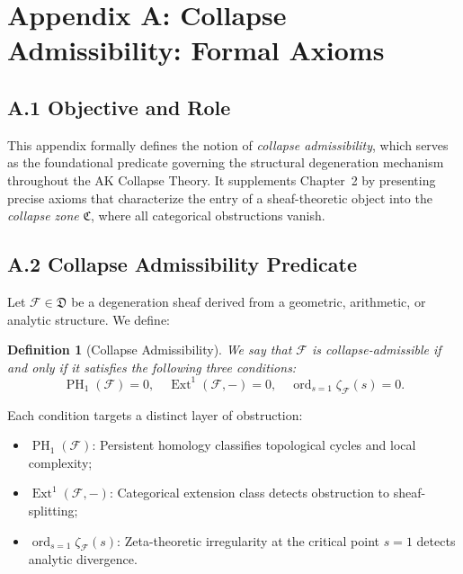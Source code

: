 \documentclass[11pt]{article}
\newtheorem{definition}[theorem]{Definition}
\DeclareMathOperator{\Ext}{Ext}
\DeclareMathOperator{\PH}{PH}
\newcommand{\ord}{\operatorname{ord}}
\begin{document}
\appendix
\section*{Appendix A: Collapse Admissibility: Formal Axioms}

\subsection*{A.1 Objective and Role}

This appendix formally defines the notion of \emph{collapse admissibility}, which serves as the foundational predicate governing the structural degeneration mechanism throughout the AK Collapse Theory. It supplements Chapter~2 by presenting precise axioms that characterize the entry of a sheaf-theoretic object into the \emph{collapse zone} \( \mathfrak{C} \), where all categorical obstructions vanish.

\subsection*{A.2 Collapse Admissibility Predicate}

Let \( \mathcal{F} \in \mathfrak{D} \) be a degeneration sheaf derived from a geometric, arithmetic, or analytic structure. We define:

\begin{definition}[Collapse Admissibility]
\label{def:collapse-admissibility}
We say that \( \mathcal{F} \) is \emph{collapse-admissible} if and only if it satisfies the following three conditions:
\[
\PH_1(\mathcal{F}) = 0, \quad \Ext^1(\mathcal{F}, -) = 0, \quad \ord_{s=1} \zeta_{\mathcal{F}}(s) = 0.
\]
\end{definition}

Each condition targets a distinct layer of obstruction:
\begin{itemize}
  \item \( \PH_1(\mathcal{F}) \): Persistent homology classifies topological cycles and local complexity;
  \item \( \Ext^1(\mathcal{F}, -) \): Categorical extension class detects obstruction to sheaf-splitting;
  \item \( \ord_{s=1} \zeta_{\mathcal{F}}(s) \): Zeta-theoretic irregularity at the critical point \( s=1 \) detects analytic divergence.
\end{itemize}
\end{document}
